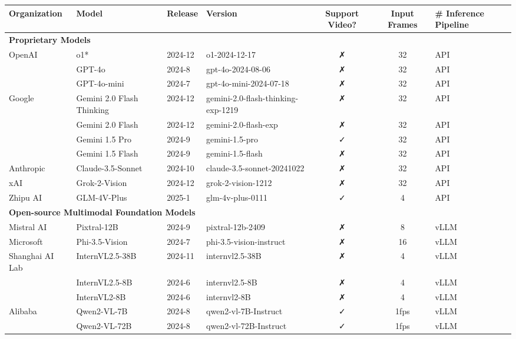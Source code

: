 \documentclass{article}
\begin{document}
\renewcommand{\arraystretch}{1.2}
\setlength{\tabcolsep}{4pt}

\begin{longtable}{l l l l c c l}
    \toprule
    \textbf{Organization} & \textbf{Model} & \textbf{Release} & \textbf{Version} & \textbf{Support Video?} & \textbf{Input Frames} & \textbf{\# Inference Pipeline} \\
    \midrule
    \multicolumn{7}{l}{\textbf{Proprietary Models}} \\
    \midrule
    OpenAI & o1* & 2024-12 & o1-2024-12-17 & ✗ & 32 & API \\
    & GPT-4o & 2024-8 & gpt-4o-2024-08-06 & ✗ & 32 & API \\
    & GPT-4o-mini & 2024-7 & gpt-4o-mini-2024-07-18 & ✗ & 32 & API \\
    Google & Gemini 2.0 Flash Thinking & 2024-12 & gemini-2.0-flash-thinking-exp-1219 & ✗ & 32 & API \\
    & Gemini 2.0 Flash & 2024-12 & gemini-2.0-flash-exp & ✗ & 32 & API \\
    & Gemini 1.5 Pro & 2024-9 & gemini-1.5-pro & ✓ & 32 & API \\
    & Gemini 1.5 Flash & 2024-9 & gemini-1.5-flash & ✗ & 32 & API \\
    Anthropic & Claude-3.5-Sonnet & 2024-10 & claude-3.5-sonnet-20241022 & ✗ & 32 & API \\
    xAI & Grok-2-Vision & 2024-12 & grok-2-vision-1212 & ✗ & 32 & API \\
    Zhipu AI & GLM-4V-Plus & 2025-1 & glm-4v-plus-0111 & ✓ & 4 & API \\
    \midrule
    \multicolumn{7}{l}{\textbf{Open-source Multimodal Foundation Models}} \\
    \midrule
    Mistral AI & Pixtral-12B & 2024-9 & pixtral-12b-2409 & ✗ & 8 & vLLM \\
    Microsoft & Phi-3.5-Vision & 2024-7 & phi-3.5-vision-instruct & ✗ & 16 & vLLM \\
    Shanghai AI Lab & InternVL2.5-38B & 2024-11 & internvl2.5-38B & ✗ & 4 & vLLM \\
    & InternVL2.5-8B & 2024-6 & internvl2.5-8B & ✗ & 4 & vLLM \\
    & InternVL2-8B & 2024-6 & internvl2-8B & ✗ & 4 & vLLM \\
    Alibaba & Qwen2-VL-7B & 2024-8 & qwen2-vl-7B-Instruct & ✓ & 1fps & vLLM \\
    & Qwen2-VL-72B & 2024-8 & qwen2-vl-72B-Instruct & ✓ & 1fps & vLLM \\

\end{longtable}
\end{document}
